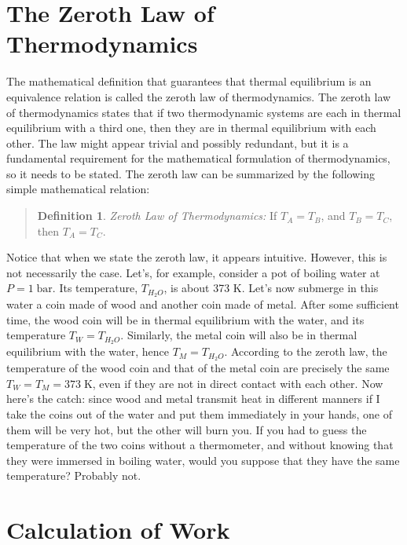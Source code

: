 \documentclass[
  9pt,
]{extbook}
\theoremstyle{definition}
\newtheorem{definition}{Definition}[chapter]
\theoremstyle{definition}
\theoremstyle{definition}
\theoremstyle{remark}
\begin{document}
\hypertarget{the-zeroth-law-of-thermodynamics}{%
\section{The Zeroth Law of Thermodynamics}\label{the-zeroth-law-of-thermodynamics}}

The mathematical definition that guarantees that thermal equilibrium is an equivalence relation is called the zeroth law of thermodynamics. The zeroth law of thermodynamics states that if two thermodynamic systems are each in thermal equilibrium with a third one, then they are in thermal equilibrium with each other. The law might appear trivial and possibly redundant, but it is a fundamental requirement for the mathematical formulation of thermodynamics, so it needs to be stated. The zeroth law can be summarized by the following simple mathematical relation:

\begin{quote}
\begin{definition}
\protect\hypertarget{def:zerothlaw}{}{\label{def:zerothlaw} }\emph{Zeroth Law of Thermodynamics:} If \(T_A = T_B\), and \(T_B = T_C\), then \(T_A = T_C\).
\end{definition}
\end{quote}

Notice that when we state the zeroth law, it appears intuitive. However, this is not necessarily the case. Let's, for example, consider a pot of boiling water at \(P=1\;\mathrm{bar}\). Its temperature, \(T_{H_2O}\), is about 373 K. Let's now submerge in this water a coin made of wood and another coin made of metal. After some sufficient time, the wood coin will be in thermal equilibrium with the water, and its temperature \(T_W = T_{H_2O}\). Similarly, the metal coin will also be in thermal equilibrium with the water, hence \(T_M = T_{H_2O}\). According to the zeroth law, the temperature of the wood coin and that of the metal coin are precisely the same \(T_W = T_M = 373\;\mathrm{K}\), even if they are not in direct contact with each other. Now here's the catch: since wood and metal transmit heat in different manners if I take the coins out of the water and put them immediately in your hands, one of them will be very hot, but the other will burn you. If you had to guess the temperature of the two coins without a thermometer, and without knowing that they were immersed in boiling water, would you suppose that they have the same temperature? Probably not.

\hypertarget{workint}{%
\section{Calculation of Work}\label{workint}}
\end{document}
